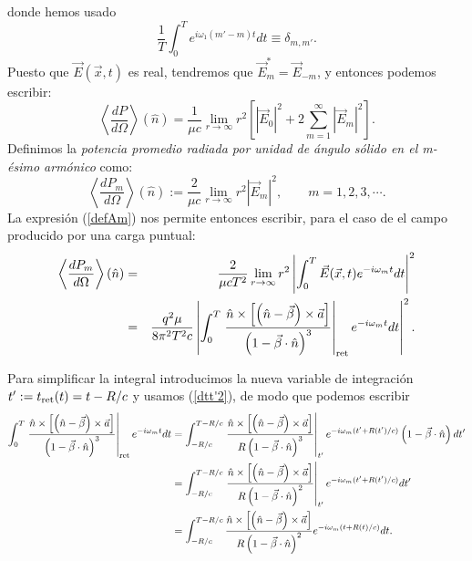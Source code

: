 donde hemos usado
\begin{equation}
\frac{1}{T}\int_0^{T}e^{i\omega_1\left(m'-m\right)t }dt\equiv\delta_{m,m' }.
\end{equation}
Puesto que $\vec{E}(\vec{x},t)$ es real, tendremos que $\vec{E}_{m}^*=\vec{E}_{-m}$, y entonces podemos escribir:
\begin{equation}\label{dPdOsumm}
\left\langle\frac{dP}{d\Omega}\right\rangle (\hat{n}) =\frac{1}{\mu c}\lim_{r\to\infty}r^2\left[\left|\vec{E}_0\right|^2
+2\sum_{m=1}^{\infty}\left|\vec{E}_{m}\right|^2\right].
\end{equation}
Definimos la \textit{potencia promedio radiada por
unidad de ángulo sólido en el m-ésimo armónico} como:
\begin{equation}
\left\langle\frac{dP_{m}}{d\Omega}\right\rangle (\hat{n}) :=\frac{2}{\mu c}\lim_{r\to\infty}r^2\left|\vec{E}_{m}\right|^2, \qquad m=1,2,3,\cdots.
\end{equation}
La expresión (\ref{defAm}) nos permite entonces escribir, para el caso de el campo producido por una carga puntual:
\begin{eqnarray}
\left\langle \frac{dP_{m}}{d\Omega}\right\rangle (\hat{n})&=&
\frac{2}{\mu cT^2}\lim_{r\to\infty}r^2\left|\int_0^{T}\vec{E}(\vec{x},t)e^{-i\omega_{m}t}dt\right|^2\\
&=&\frac{q^2\mu}{8\pi^2T^2c}\left| \int_0^{T}\left.\frac{\hat{n}\times\left[  \left(\hat{n}-\vec{\beta}\right)\times\vec{a}\right] }{\left(
1-\vec{\beta}\cdot\hat{n}\right)^3}\right|_{\rm ret} e^{-i\omega_{m}t}dt\right|^2.
\end{eqnarray}

Para simplificar la integral introducimos la nueva variable de integración
$t':=t_{\rm ret}(t)=t-{R}/{c}$ y usamos (\ref{dtt'2}), de modo que podemos escribir
\begin{align}
\int_0^{T}\left.\frac{\hat{n}\times\left[\left(\hat{n}-\vec{\beta}\right)\times\vec{a}\right] }{\left(1-\vec{\beta}\cdot\hat{n}\right)^3}\right|_{\rm ret} e^{-i\omega_{m}t}dt &= \int_{-R/c}^{T-R/c}\left.\frac{\hat{n}\times\left[ \left( \hat{n}-\vec{\beta}\right)\times{\vec{a}}\right] }{R\left( 1-\vec{\beta}\cdot\hat{n}\right)^3}\right|_{t'}e^{-i\omega_m (t'+R(t')/c)}\left(1-\vec{\beta}\cdot\hat{n}\right) dt' \\
&= \int_{-R/c}^{T-R/c}\left.\frac{\hat{n}\times\left[ \left( \hat{n}-\vec{\beta}\right)
\times{\vec{a}}\right] }{R\left(1-\vec{\beta}\cdot\hat{n}\right)^2}
\right|_{t'}e^{-i\omega_m (t'+R(t')/c)} dt' \\
&= \int_{-R/c}^{T-R/c}\frac{\hat{n}\times\left[ \left( \hat{n}-\vec{\beta}\right)
\times{\vec{a}}\right] }{R\left( 1-\vec{\beta}\cdot\hat{n}\right)^2}
e^{-i\omega_m(t+R(t)/c)} dt.
\end{align}

